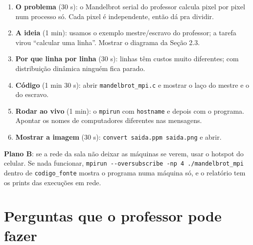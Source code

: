 \documentclass[a4paper,11pt]{article}
\begin{document}
\begin{enumerate}[leftmargin=*]
  \item \textbf{O problema} (30 s): o Mandelbrot serial do professor calcula pixel por pixel num processo só. Cada pixel é independente, então dá pra dividir.
  \item \textbf{A ideia} (1 min): usamos o exemplo mestre/escravo do professor; a tarefa virou ``calcular uma linha''. Mostrar o diagrama da Seção 2.3.
  \item \textbf{Por que linha por linha} (30 s): linhas têm custos muito diferentes; com distribuição dinâmica ninguém fica parado.
  \item \textbf{Código} (1 min 30 s): abrir \texttt{mandelbrot\_mpi.c} e mostrar o laço do mestre e o do escravo.
  \item \textbf{Rodar ao vivo} (1 min): o \texttt{mpirun} com \texttt{hostname} e depois com o programa. Apontar os nomes de computadores diferentes nas mensagens.
  \item \textbf{Mostrar a imagem} (30 s): \texttt{convert saida.ppm saida.png} e abrir.
\end{enumerate}

\textbf{Plano B}: se a rede da sala não deixar as máquinas se verem, usar o hotspot do celular. Se nada funcionar, \texttt{mpirun -{}-oversubscribe -np 4 ./mandelbrot\_mpi} dentro de \texttt{codigo\_fonte} mostra o programa numa máquina só, e o relatório tem os prints das execuções em rede.

\section{Perguntas que o professor pode fazer}
\end{document}
